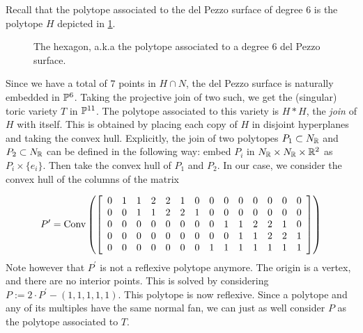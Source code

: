 \documentclass[11pt, english]{article}
\begin{document}
Recall that the polytope associated to the del Pezzo surface of degree $6$ is the polytope $H$ depicted in \ref{fig:hexagon}. 

\begin{figure}[ht]
\label{fig:hexagon}
\centering
{}
\caption{The hexagon, a.k.a the polytope associated to a degree 6 del Pezzo surface.}
\end{figure}
 
Since we have a total of $7$ points in $H \cap N$, the del Pezzo surface is naturally embedded in $\mathbb{P}^6$. Taking the projective join of two such, we get the (singular) toric variety $T$ in $\mathbb{P}^{11}$. The polytope associated to this variety is $H \ast H$, the \emph{join} of $H$ with itself. This is obtained by placing each copy of $H$ in disjoint hyperplanes and taking the convex hull. Explicitly, the join of two polytopes $P_1 \subset N_{\mathbb{R}}$ and $P_2 \subset N_{\mathbb{R}}$ can be defined in the following way: embed $P_i$ in $N_{\mathbb{R}} \times N_{\mathbb{R}} \times \mathbb{R}^2$ as $P_i \times \{e_i\}$. Then take the convex hull of $P_1$ and $P_2$. In our case, we consider the convex hull of the columns of the  matrix

\[
P^\prime = \Conv \left( \left[
\begin{array}{*{14}c}
0 & 1 & 1 & 2 & 2 & 1 & 0 & 0 & 0 & 0 & 0 & 0 & 0 & 0 \\
0 & 0 & 1 & 1 & 2 & 2 & 1 & 0 & 0 & 0 & 0 & 0 & 0 & 0 \\
0 & 0 & 0 & 0 & 0 & 0 & 0 & 0 & 1 & 1 & 2 & 2 & 1 & 0 \\
0 & 0 & 0 & 0 & 0 & 0 & 0 & 0 & 0 & 1 & 1 & 2 & 2 & 1 \\
0 & 0 & 0 & 0 & 0 & 0 & 0 & 1 & 1 & 1 & 1 & 1 & 1 & 1
\end{array} \right] \right)
\]
Note however that $P^\prime$ is not a reflexive polytope anymore. The origin is a vertex, and there are no interior points. This is solved by considering $P := 2 \cdot P^\prime - (1,1,1,1,1)$. This polytope is now reflexive. Since a polytope and any of its multiples have the same normal fan, we can just as well consider $P$ as the polytope associated to $T$.
\end{document}
